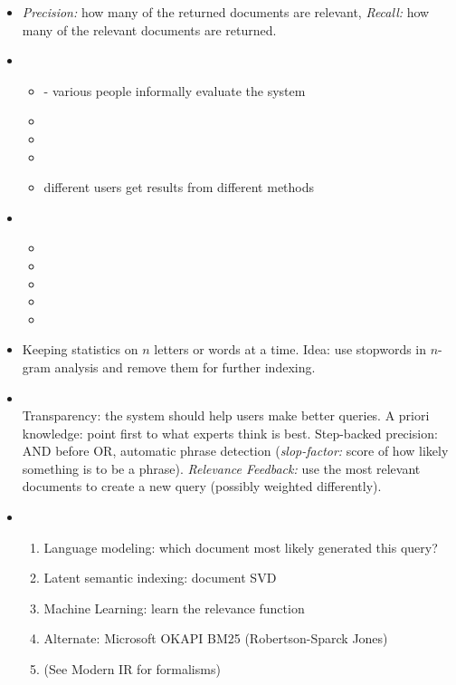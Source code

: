 \documentclass{article}
\begin{document}
\begin{itemize}
\item {} \emph{Precision:} how many of the returned documents are relevant, \emph{Recall:} how many of the relevant documents are returned.

\item {}\\
    \begin{itemize}
        \item {} - various people informally evaluate the system
        \item {}
        \item {}
        \item {}
        \item {} different users get results from different methods
    \end{itemize}

\item {}\\
    \begin{itemize}
    \item {}
    \item {}
    \item {}
    \item {}
    \item {}
    \end{itemize}

\item {} Keeping statistics on $n$ letters or words at a time.  Idea: use stopwords in $n$-gram analysis and remove them for further indexing.

\item {}\\
    Transparency: the system should help users make better queries.  A priori knowledge: point first to what experts think is best.  Step-backed precision: AND before OR, automatic phrase detection (\emph{slop-factor:} score of how likely something is to be a phrase).  \emph{Relevance Feedback:} use the most relevant documents to create a new query (possibly weighted differently).

\item {}\\
    \begin{enumerate}
        \item Language modeling: which document most likely generated this query?
        \item Latent semantic indexing: document SVD
        \item Machine Learning: learn the relevance function
        \item Alternate: Microsoft OKAPI BM25 (Robertson-Sparck Jones)
        \item (See Modern IR for formalisms)
    \end{enumerate}

\end{itemize}
\end{document}
